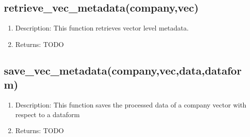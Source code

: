 \documentclass{article}
\begin{document}
\subsection{retrieve_vec_metadata(company,vec)}
\begin{enumerate}
\item Description: This function retrieves vector level metadata.
\item Returns: 
TODO
\end{enumerate}

\subsection{save_vec_metadata(company,vec,data,dataform)}
\begin{enumerate}
\item Description: This function saves the processed data of a company vector with respect to a dataform
\item Returns: 
TODO
\end{enumerate}
\end{document}
